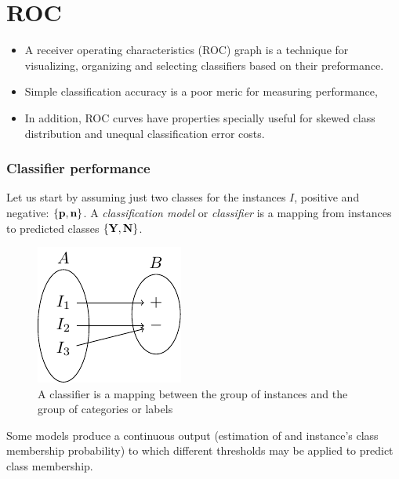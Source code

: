 \documentclass{beamer}
\begin{document}
\section{ROC}

\begin{frame}

  \begin{itemize}
    \item A receiver operating characteristics (ROC) graph is a technique for visualizing, organizing and selecting classifiers based on their preformance.
    \item Simple classification accuracy is a poor meric for measuring performance,
    \item In addition, ROC curves have properties specially useful for skewed class distribution and unequal classification error costs.
  \end{itemize}
\end{frame}

\begin{frame}
  \frametitle{Classifier performance}

  Let us start by assuming just two classes for the instances $I$, positive and negative: $\{\textbf{p},\textbf{n}\}$. A {\em classification model} or {\em classifier} is a mapping from instances to predicted classes $\{\textbf{Y},\textbf{N}\}$.

\begin{figure}[htbp]
  \centering
  \includegraphics[scale=1.]{mapping}
  \caption{A classifier is a mapping between the group of instances and the group of categories or labels}
  \label{Fig:mapping}
\end{figure}
Some models produce a continuous output (estimation of and instance's class membership probability) to which different thresholds may be applied to predict class membership.

\end{frame}
\end{document}
